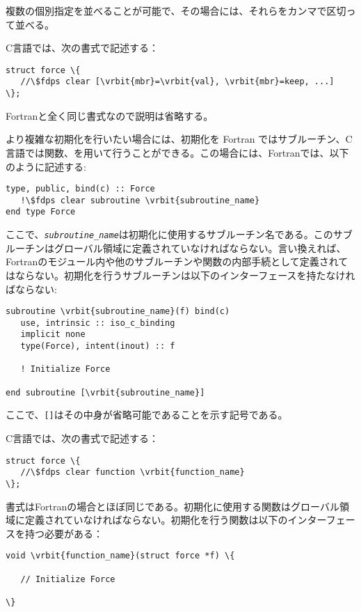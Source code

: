 \begin{enumerate}[leftmargin=*,label=(\arabic*)]
複数の個別指定を並べることが可能で、その場合には、それらをカンマで区切って並べる。

C言語では、次の書式で記述する：
\begin{screen}
\begin{Verbatim}[commandchars=\\\{\}]
struct force \{
   //\$fdps clear [\vrbit{mbr}=\vrbit{val}, \vrbit{mbr}=keep, ...] 
\};
\end{Verbatim}
\end{screen}
Fortranと全く同じ書式なので説明は省略する。


より複雑な初期化を行いたい場合には、初期化を Fortran ではサブルーチン、C言語では関数、を用いて行うことができる。この場合には、Fortranでは、以下のように記述する:
\begin{screen}
\begin{Verbatim}[commandchars=\\\{\}]
type, public, bind(c) :: Force
   !\$fdps clear subroutine \vrbit{subroutine_name}
end type Force
\end{Verbatim}
\end{screen}
ここで、\textit{\texttt{subroutine\_name}}は初期化に使用するサブルーチン名である。このサブルーチンはグローバル領域に定義されていなければならない。言い換えれば、Fortranのモジュール内や他のサブルーチンや関数の内部手続として定義されてはならない。初期化を行うサブルーチンは以下のインターフェースを持たなければならない:
\begin{screen}
\begin{Verbatim}[commandchars=\\\{\}]
subroutine \vrbit{subroutine_name}(f) bind(c)
   use, intrinsic :: iso_c_binding
   implicit none
   type(Force), intent(inout) :: f
   
   ! Initialize Force
   
end subroutine [\vrbit{subroutine_name}]
\end{Verbatim}
\end{screen}
ここで、\texttt{[]}はその中身が省略可能であることを示す記号である。

C言語では、次の書式で記述する：
\begin{screen}
\begin{Verbatim}[commandchars=\\\{\}]
struct force \{
   //\$fdps clear function \vrbit{function_name}
\};
\end{Verbatim}
\end{screen}
書式はFortranの場合とほぼ同じである。初期化に使用する関数はグローバル領域に定義されていなければならない。初期化を行う関数は以下のインターフェースを持つ必要がある：
\begin{screen}
\begin{Verbatim}[commandchars=\\\{\}]
void \vrbit{function_name}(struct force *f) \{
   
   // Initialize Force
   
\}
\end{Verbatim}
\end{screen}

\end{enumerate}

